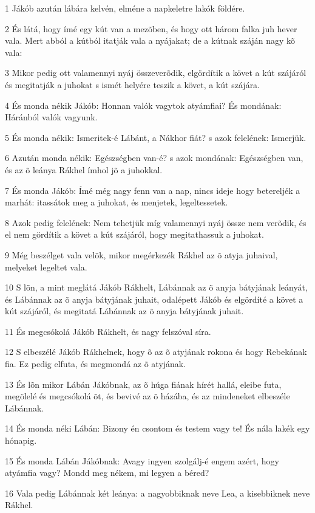 \par 1 Jákób azután lábára kelvén, elméne a napkeletre lakók földére.
\par 2 És látá, hogy ímé egy kút van a mezõben, és hogy ott három falka juh hever vala. Mert abból a kútból itatják vala a nyájakat; de a kútnak száján nagy kõ vala:
\par 3 Mikor pedig ott valamennyi nyáj összeverõdik, elgördítik a követ a kút szájáról és megitatják a juhokat s ismét helyére teszik a követ, a kút szájára.
\par 4 És monda nékik Jákób: Honnan valók vagytok atyámfiai? És mondának: Háránból valók vagyunk.
\par 5 És monda nékik: Ismeritek-é Lábánt, a Nákhor fiát? s azok felelének: Ismerjük.
\par 6 Azután monda nékik: Egészségben van-é? s azok mondának: Egészségben van, és az õ leánya Rákhel ímhol jõ a juhokkal.
\par 7 És monda Jákób: Ímé még nagy fenn van a nap, nincs ideje hogy betereljék a marhát: itassátok meg a juhokat, és menjetek, legeltessetek.
\par 8 Azok pedig felelének: Nem tehetjük míg valamennyi nyáj össze nem verõdik, és el nem gördítik a követ a kút szájáról, hogy megitathassuk a juhokat.
\par 9 Még beszélget vala velõk, mikor megérkezék Rákhel az õ atyja juhaival, melyeket legeltet vala.
\par 10 S lõn, a mint meglátá Jákób Rákhelt, Lábánnak az õ anyja bátyjának leányát, és Lábánnak az õ anyja bátyjának juhait, odalépett Jákób és elgördíté a követ a kút szájáról, és megitatá Lábánnak az õ anyja bátyjának juhait.
\par 11 És megcsókolá Jákób Rákhelt, és nagy felszóval síra.
\par 12 S elbeszélé Jákób Rákhelnek, hogy õ az õ atyjának rokona és hogy Rebekának fia. Ez pedig elfuta, és megmondá az õ atyjának.
\par 13 És lõn mikor Lábán Jákóbnak, az õ húga fiának hírét hallá, eleibe futa, megölelé és megcsókolá õt, és bevivé az õ házába, és az mindeneket elbeszéle Lábánnak.
\par 14 És monda néki Lábán: Bizony én csontom és testem vagy te! És nála lakék egy hónapig.
\par 15 És monda Lábán Jákóbnak: Avagy ingyen szolgálj-é engem azért, hogy atyámfia vagy? Mondd meg nékem, mi legyen a béred?
\par 16 Vala pedig Lábánnak két leánya: a nagyobbiknak neve Lea, a kisebbiknek neve Rákhel.
